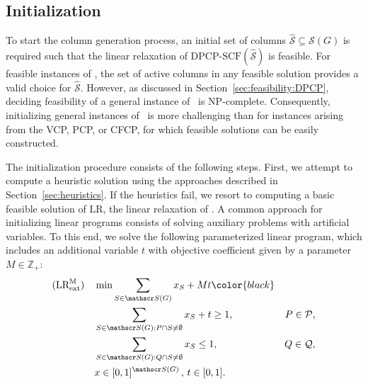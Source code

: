 \documentclass[preprint, 11pt, authoryear]{elsarticle}
\newcommand{\PP}{{\mathcal P}}
\newcommand{\QQ}{{\mathcal Q}}
\newcommand{\Z}{{\mathbb Z}}
\newcommand{\STAB}{{\mathscr S}}
\newcommand{\newproblem}{\text{DPCP}}
\newcommand{\setcoveringform}{\text{DPCP-SCF}}
\newcommand{\setcoveringformLR}{\text{LR}}
\newcommand{\setcoveringformLRM}{\text{LR}^{\text{M}}_{\text{ext}}}
\begin{document}
\subsection{Initialization}\label{sec:branch-and-price-algo-init}


To start the column generation process, an initial set of columns $\hat \STAB \subseteq \STAB(G)$ is required such that the linear relaxation of $\setcoveringform(\hat \STAB)$ is feasible.
For feasible instances of \newproblem, the set of active columns in any feasible solution provides a valid choice for $\hat \STAB$.
However, as discussed in Section~\ref{sec:feasibility:DPCP}, deciding feasibility of a general instance of \newproblem\ is NP-complete.
Consequently, initializing general instances of \newproblem\ is more challenging than for instances arising from the VCP, PCP, or CFCP, for which feasible solutions can be easily constructed.

The initialization procedure consists of the following steps.
First, we attempt to compute a heuristic solution using the approaches described in Section~\ref{sec:heuristics}.
If the heuristics fail, 
we resort to computing a basic feasible solution of $\setcoveringformLR$, the linear relaxation of \setcoveringform.
A common approach for initializing linear programs consists of solving auxiliary problems with artificial variables.
To this end, we solve the following parameterized linear program, which includes an additional variable $t$ with objective coefficient given by a parameter $M\in\mathbb Z_+$:
\begin{align}
(\setcoveringformLRM) \quad  &   \min \sum_{S \in \STAB(G)} x_S+ M t
\color{black}
\\
 & \sum_{S \in \STAB(G): P \cap S \neq \emptyset} x_S + t \geq 1, &  P \in \PP, \label{SCFormulation.A} \\
& \sum_{S \in \STAB(G): Q \cap S \neq \emptyset} x_S \leq 1, &  Q \in \QQ, \label{SCFormulation.B} \\
& x \in [0,1]^{\STAB(G)} \, , \, t \in [0,1]. \nonumber
\end{align}
\end{document}
